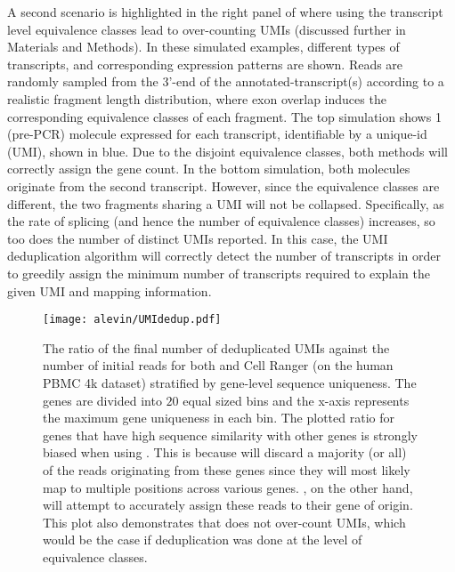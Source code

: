 A second scenario is highlighted in the right panel of 
where using the transcript level equivalence classes lead to over-counting UMIs
(discussed further in Materials and Methods). In these simulated examples, different types of
transcripts, and corresponding expression patterns are shown. 
Reads are randomly sampled from the 3'-end of the
annotated-transcript(s) according to a realistic fragment length distribution,
where exon overlap induces the corresponding equivalence classes of each
fragment. The top simulation shows 1 (pre-PCR) molecule expressed for each transcript, 
identifiable by a unique-id (UMI), shown in blue. Due to the disjoint equivalence classes, both methods will
correctly assign the gene count. In the bottom simulation, both molecules originate from the second transcript. 
However, since the equivalence classes are different, the two fragments sharing a UMI will not be collapsed. 
Specifically, as the rate of splicing (and hence the number of equivalence classes) increases, so too does the number of distinct UMIs 
reported. In this case, the \alevin UMI deduplication algorithm will correctly detect the number of transcripts in order to greedily assign the minimum number of transcripts required to explain the given UMI and mapping information.

\begin{figure}
  \texttt{[image: alevin/UMIdedup.pdf]}
  \caption{The ratio of the final number of deduplicated
    UMIs against the number of initial reads for both \alevin and Cell Ranger (on the human PBMC 4k dataset)
    stratified by gene-level sequence uniqueness. The genes are divided into
    $20$ equal sized bins and the x-axis represents the maximum gene uniqueness
    in each bin. The plotted ratio for genes that have high sequence
    similarity with other genes is strongly biased when using \cellr. This is
    because \cellr will discard a majority (or all) of the reads originating
    from these genes since they will most likely map to multiple positions
    across various genes. \Alevin, on the other hand, will attempt to accurately
    assign these reads to their gene of origin. This plot also demonstrates that \alevin does not over-count UMIs,
    which would be the case if deduplication was done at the level of equivalence classes.}
  \label{fig:umidedup}
\end{figure}

